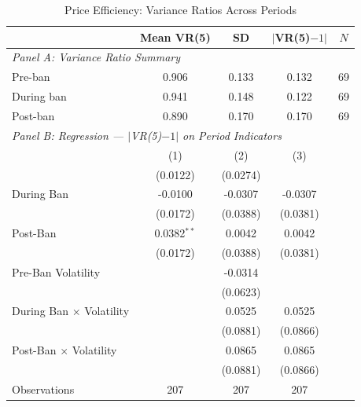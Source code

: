 \begin{table}[t]
\centering
\caption{Price Efficiency: Variance Ratios Across Periods}
\label{tab:efficiency}
\small
\begin{tabular}{lcccc}
\hline\hline
 & Mean VR(5) & SD & $|$VR(5)$-1|$ & $N$ \\
\hline
\multicolumn{5}{l}{\textit{Panel A: Variance Ratio Summary}} \\
Pre-ban & 0.906 & 0.133 & 0.132 & 69 \\
During ban & 0.941 & 0.148 & 0.122 & 69 \\
Post-ban & 0.890 & 0.170 & 0.170 & 69 \\
\hline
\multicolumn{5}{l}{\textit{Panel B: Regression --- $|$VR(5)$-1|$ on Period Indicators}} \\
 & (1) & (2) & (3) & \\
\hline
                                   & (0.0122)       & (0.0274)       &   \\    
   During Ban                      & -0.0100        & -0.0307        & -0.0307\\    
                                   & (0.0172)       & (0.0388)       & (0.0381)\\    
   Post-Ban                        & 0.0382$^{**}$  & 0.0042         & 0.0042\\    
                                   & (0.0172)       & (0.0388)       & (0.0381)\\    
   Pre-Ban Volatility              &                & -0.0314        &   \\    
                                   &                & (0.0623)       &   \\    
   During Ban $\times$ Volatility  &                & 0.0525         & 0.0525\\    
                                   &                & (0.0881)       & (0.0866)\\    
   Post-Ban $\times$ Volatility    &                & 0.0865         & 0.0865\\    
                                   &                & (0.0881)       & (0.0866)\\    
   Observations                    & 207            & 207            & 207\\   
\hline\hline
\end{tabular}
\par{}
\end{table}
